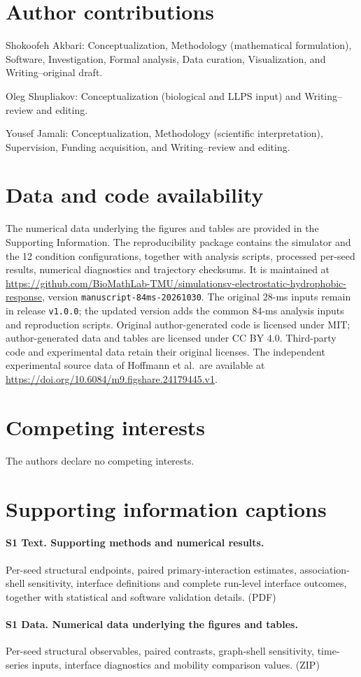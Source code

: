 \documentclass[11pt,letterpaper]{article}
\begin{document}
\section*{Author contributions}
Shokoofeh Akbari: Conceptualization, Methodology (mathematical formulation),
Software, Investigation, Formal analysis, Data curation, Visualization,
and Writing--original draft.\par
\noindent Oleg Shupliakov: Conceptualization (biological and LLPS input)
and Writing--review and editing.\par
\noindent Yousef Jamali: Conceptualization, Methodology (scientific
interpretation), Supervision, Funding acquisition, and Writing--review
and editing.

\section*{Data and code availability}
The numerical data underlying the figures and tables are provided in the
Supporting Information. The reproducibility package contains the simulator
and the 12 condition configurations, together with analysis scripts,
processed per-seed results, numerical diagnostics and trajectory checksums.
It is maintained at \url{https://github.com/BioMathLab-TMU/simulationsv-electrostatic-hydrophobic-response},
version \texttt{manuscript-84ms-20261030}. The original 28-ms inputs remain in release \texttt{v1.0.0}; the updated version adds the common 84-ms analysis inputs and reproduction scripts.
Original author-generated code is licensed under MIT; author-generated data and tables are licensed under CC BY 4.0. Third-party code and experimental data retain their original licenses. The independent experimental source data of Hoffmann et al.\ are available at \url{https://doi.org/10.6084/m9.figshare.24179445.v1}.

\section*{Competing interests}
The authors declare no competing interests.



\section*{Supporting information captions}
\paragraph{S1 Text. Supporting methods and numerical results.}
Per-seed structural endpoints, paired primary-interaction estimates,
association-shell sensitivity, interface definitions and complete
run-level interface outcomes, together with statistical and software
validation details. (PDF)

\paragraph{S1 Data. Numerical data underlying the figures and tables.}
Per-seed structural observables, paired contrasts, graph-shell sensitivity,
time-series inputs, interface diagnostics and mobility comparison values. (ZIP)
\end{document}
